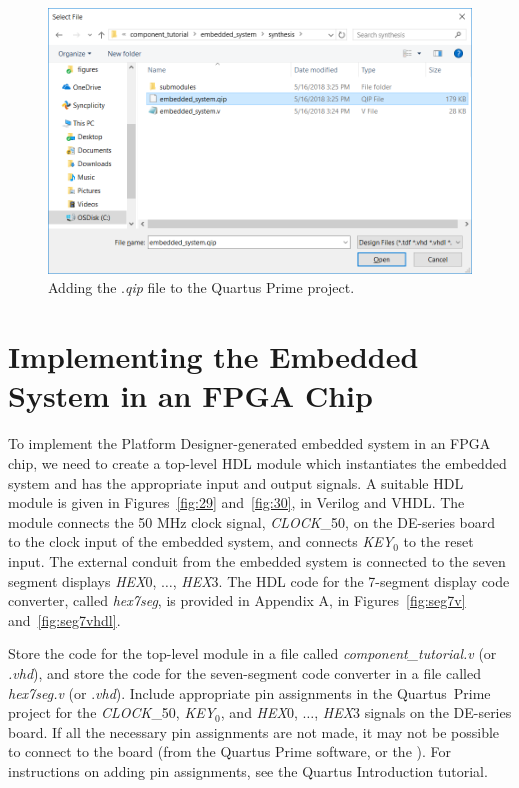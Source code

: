 \documentclass[11pt, twoside, pdftex]{article}
\begin{document}
\begin{figure}[H]
   \begin{center}
        \includegraphics[scale=0.65]{figures/figure28.png}
   \end{center}
   \caption{Adding the .{\it qip} file to the Quartus Prime project.}
	\label{fig:28}
\end{figure}

\clearpage
\newpage
\section{Implementing the Embedded System in an FPGA Chip}
To implement the Platform Designer-generated embedded system in an FPGA chip, we need to 
create a top-level HDL module which instantiates the embedded system and has the appropriate 
input and output signals.  A suitable HDL module is given in
Figures~\ref{fig:29} and~\ref{fig:30}, in Verilog and VHDL. The module connects the 50 MHz
clock signal, {\it CLOCK}\_50, on the DE-series board to the clock input of the 
embedded system, and connects
{\it KEY}$_0$ to the reset input. The external conduit from the embedded system is
connected to the seven segment displays {\it HEX}0, $\ldots$, {\it HEX}3. The HDL code for
the 7-segment display code converter, called {\it hex7seg}, is provided in 
Appendix A, in Figures~\ref{fig:seg7v} and~\ref{fig:seg7vhdl}.

Store the code for the top-level module in a file called {\it component\_tutorial.v} 
(or {\it .vhd}), and store the code for the seven-segment code converter
in a file called {\it hex7seg.v} (or .{\it vhd}).
Include appropriate pin assignments in the Quartus~Prime project for the 
{\it CLOCK}\_50, {\it KEY}$_0$, and {\it HEX}0, $\ldots$, {\it HEX}3 signals on the 
DE-series board. If all the necessary pin assignments are not made, it may not be possible to connect to
the board (from the Quartus Prime software, or the \productNameMed{}). For instructions on adding
pin assignments, see the {\sf Quartus Introduction} tutorial.
\end{document}
